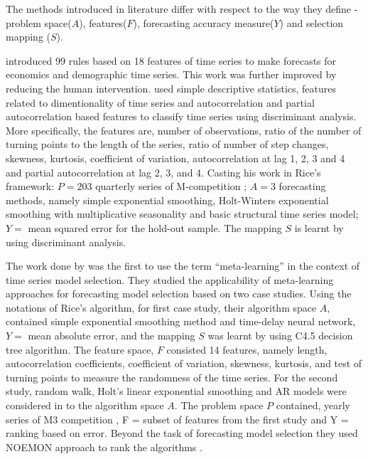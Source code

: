 \documentclass[11pt,a4paper,]{article}
\theoremstyle{definition}
\theoremstyle{definition}
\theoremstyle{definition}
\theoremstyle{remark}
\begin{document}
The methods introduced in literature differ with respect to the way they
define - problem space(\(A\)), features(\(F\)), forecasting accuracy
measure(\(Y\)) and selection mapping (\(S\)).

\textcite{collopy1992rule} introduced 99 rules based on 18 features of
time series to make forecasts for economics and demographic time series.
This work was further improved by \textcite{armstrong2001s} reducing the
human intervention. \textcite{shah1997model} used simple descriptive
statistics, features related to dimentionality of time series and
autocorrelation and partial autocorrelation based features to classify
time series using discriminant analysis. More specifically, the features
are, number of observations, ratio of the number of turning points to
the length of the series, ratio of number of step changes, skewness,
kurtosis, coefficient of variation, autocorrelation at lag 1, 2, 3 and 4
and partial autocorrelation at lag 2, 3, and 4. Casting his work in
Rice's framework: \(P=203\) quarterly series of M-competition
\autocite{makridakis1982accuracy}; \(A=3\) forecasting methods, namely
simple exponential smoothing, Holt-Winters exponential smoothing with
multiplicative seasonality and basic structural time series model;
\(Y=\) mean squared error for the hold-out sample. The mapping \(S\) is
learnt by using discriminant analysis.

The work done by \textcite{prudencio2004meta} was the first to use the
term ``meta-learning'' in the context of time series model selection.
They studied the applicability of meta-learning approaches for
forecasting model selection based on two case studies. Using the
notations of Rice's algorithm, for first case study, their algorithm
space \(A\), contained simple exponential smoothing method and
time-delay neural network, \(Y=\) mean absolute error, and the mapping
\(S\) was learnt by using C4.5 decision tree algorithm. The feature
space, \(F\) consisted 14 features, namely length, autocorrelation
coefficients, coefficient of variation, skewness, kurtosis, and test of
turning points to measure the randomness of the time series. For the
second study, random walk, Holt's linear exponential smoothing and AR
models were considered in to the algorithm space \(A\). The problem
space \(P\) contained, yearly series of M3 competition
\autocite{makridakis2000m3}, F = subset of features from the first study
and Y = ranking based on error. Beyond the task of forecasting model
selection they used NOEMON approach to rank the algorithms
\autocite{kalousis1999noemon}.
\end{document}
